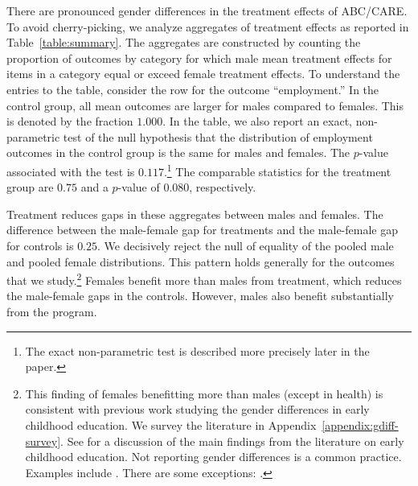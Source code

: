 There are pronounced gender differences in the treatment effects of ABC/CARE. To avoid cherry-picking, we analyze aggregates of treatment effects as reported in Table~\ref{table:summary}. The aggregates are constructed by counting the proportion of outcomes by category for which male mean treatment effects for items in a category equal or exceed female treatment effects. To understand the entries to the table, consider the row for the outcome ``employment.'' In the control group, all mean outcomes are larger for males compared to females. This is denoted by the fraction $1.000$. In the table, we also report an exact, non-parametric test of the null hypothesis that the distribution of employment outcomes in the control group is the same for males and females. The $p$-value associated with the test is $0.117$.\footnote{The exact non-parametric test is described more precisely later in the paper.} The comparable statistics for the treatment group are $0.75$ and a $p$-value of $0.080$, respectively.

Treatment reduces gaps in these aggregates between males and females. The difference between the male-female gap for treatments and the male-female gap for controls is $0.25$. We decisively reject the null of equality of the pooled male and pooled female distributions. This pattern holds generally for the outcomes that we study.\footnote{This finding of females benefitting more than males (except in health) is consistent with previous work studying the gender differences in early childhood education. We survey the literature in Appendix~\ref{appendix:gdiff-survey}. See \citet{Elango_Hojman_etal_2016_Early-Edu} for a discussion of the main findings from the literature on early childhood education. Not reporting gender differences is a common practice. Examples include \citet{Schweinhart_Montie_ea_2005_BOOKlifetime,Bernal_Keane_2011_JoLE,Cascio_Schanzenbach_2013_ImpactsExpandingAccess,Bitler_et_al_2014_Head_Start_Unpublished,Kline_Walters_2016_QJE}. There are some exceptions: \citet{Heckman_2005_Perry,Anderson_2008_JASA,Heckman_Moon_etal_2010_QE,Campbell_Conti_etal_2014_EarlyChildhoodInvestments,Garcia_Heckman_Leaf_etal_2017_Comp_CBA_Unpublished}.} Females benefit more than males from treatment, which reduces the male-female gaps in the controls. However, males also benefit substantially from the program.

